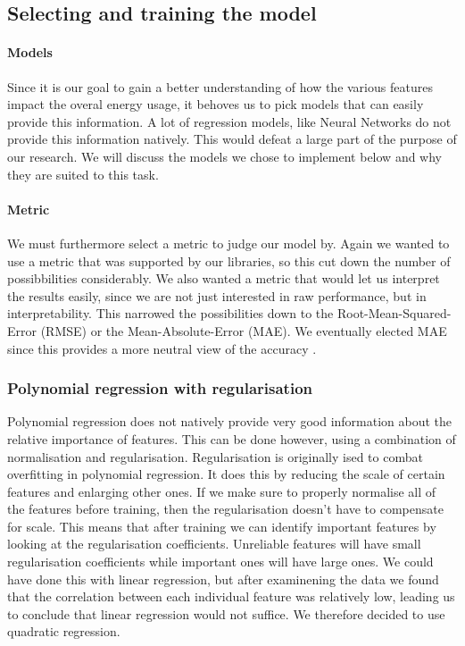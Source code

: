 \documentclass[british]{article}
\begin{document}
\subsection{Selecting and training the model}
\label{modelSelection}
\paragraph{Models}Since it is our goal to gain a better understanding of how the various features impact the overal energy usage, it behoves us to pick models that can easily provide this information. A lot of regression models, like Neural Networks do not provide this information natively. This would defeat a large part of the purpose of our research. We will discuss the models we chose to implement below and why they are suited to this task. 

\paragraph{Metric}We must furthermore select a metric to judge our model by. Again we wanted to use a metric that was supported by our libraries, so this cut down the number of possibbilities considerably. We also wanted a metric that would let us interpret the results easily, since we are not just interested in raw performance, but in interpretability. This narrowed the possibilities down to the Root-Mean-Squared-Error  (RMSE) or the Mean-Absolute-Error (MAE). We eventually elected MAE since this provides a more neutral view of the accuracy \autocite{Willmott2009}.

\subsubsection{Polynomial regression with regularisation}  Polynomial regression does not natively provide very good information about the relative importance of features. This can be done however, using a combination of normalisation and regularisation. Regularisation is originally ised to combat overfitting in polynomial regression. It does this by reducing the scale of certain features and enlarging other ones. If we make sure to properly normalise all of the features before training, then the regularisation doesn't have to compensate for scale. This means that after training we can identify important features by looking at the regularisation coefficients. Unreliable features will have small regularisation coefficients while important ones will have large ones. We could have done this with linear regression, but after examinening the data we found that the correlation between each individual feature was relatively low, leading us to conclude that linear regression would not suffice. We therefore decided to use quadratic regression. 
\end{document}
